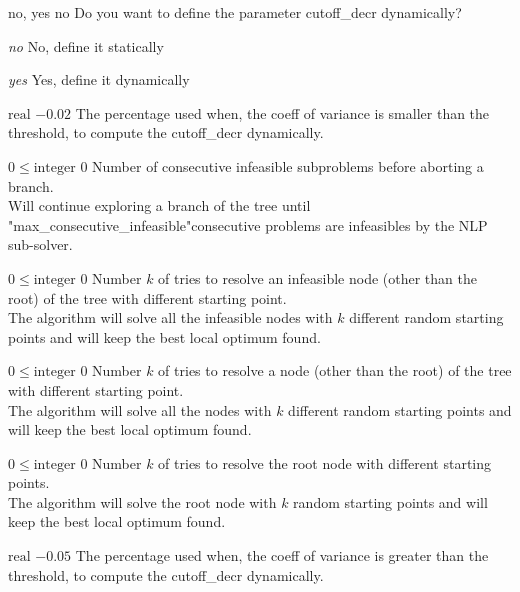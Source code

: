 %
{no, yes}%
{no}%
{Do you want to define the parameter cutoff\_decr dynamically?}%
{\begin{list}{}{
\setlength{\parsep}{0em}
\setlength{\leftmargin}{3ex}
\setlength{\labelwidth}{1ex}
\setlength{\itemindent}{0ex}
\setlength{\topsep}{0pt}}
\item[\textit{no}] No, define it statically
\item[\textit{yes}] Yes, define it dynamically
\end{list}
}

%
{$\textrm{real}$}%
{$-0.02$}%
{The percentage used when, the coeff of variance is smaller than the threshold, to compute the cutoff\_decr dynamically.}%
{}

%
{$0\leq\textrm{integer}$}%
{$0$}%
{Number of consecutive infeasible subproblems before aborting a branch.\\
Will continue exploring a branch of the tree until "max\_consecutive\_infeasible"consecutive problems are infeasibles by the NLP sub-solver.}%
{}

%
{$0\leq\textrm{integer}$}%
{$0$}%
{Number $k$ of tries to resolve an infeasible node (other than the root) of the tree with different starting point.\\
The algorithm will solve all the infeasible nodes with $k$ different random starting points and will keep the best local optimum found.}%
{}

%
{$0\leq\textrm{integer}$}%
{$0$}%
{Number $k$ of tries to resolve a node (other than the root) of the tree with different starting point.\\
The algorithm will solve all the nodes with $k$ different random starting points and will keep the best local optimum found.}%
{}

%
{$0\leq\textrm{integer}$}%
{$0$}%
{Number $k$ of tries to resolve the root node with different starting points.\\
The algorithm will solve the root node with $k$ random starting points and will keep the best local optimum found.}%
{}

%
{$\textrm{real}$}%
{$-0.05$}%
{The percentage used when, the coeff of variance is greater than the threshold, to compute the cutoff\_decr dynamically.}%
{}

